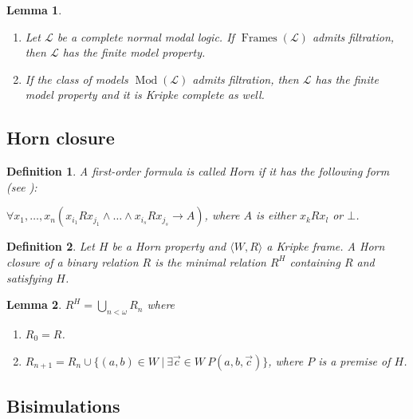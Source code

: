 \documentclass[a4paper]{article}
\theoremstyle{defin}
\newtheorem{defin}{Definition}
\theoremstyle{theorem}
\theoremstyle{prop}
\theoremstyle{lemma}
\newtheorem{lemma}{Lemma}
\theoremstyle{fact}
\theoremstyle{ex}
\theoremstyle{col}
\theoremstyle{claim}
\begin{document}
\begin{lemma}
  $ $

\begin{enumerate}
  \item Let $\mathcal{L}$ be a complete normal modal logic. If $\operatorname{Frames}(\mathcal{L})$ admits filtration, then $\mathcal{L}$ has the finite model property.
  \item If the class of models $\operatorname{Mod}(\mathcal{L})$ admits filtration, then $\mathcal{L}$ has the finite model property and it is Kripke complete as well.
\end{enumerate}
\end{lemma}

\subsection{Horn closure}

\begin{defin} A first-order formula is called Horn if it has the following form (see \cite{chang1990model}):

  \begin{center}
    $\forall x_1, \dots, x_n (x_{i_1} R x_{j_1} \land \dots \land x_{i_s} R x_{j_s} \rightarrow A)$, where $A$ is either $x_k R x_l$ or $\bot$.
  \end{center}
\end{defin}

\begin{defin}
  Let $H$ be a Horn property and $\langle W, R \rangle$ a Kripke frame. A Horn closure of a binary relation $R$ is the minimal relation $R^{H}$ containing $R$ and satisfying $H$.
\end{defin}

\begin{lemma}
  $R^{H} = \bigcup \limits_{n < \omega} R_n$ where

  \begin{enumerate}
    \item $R_0 = R$.
    \item $R_{n + 1} = R_n \cup \{ (a, b) \in W \: | \: \exists \vec{c} \in W \: P(a, b, \vec{c})\}$, where $P$ is a premise of $H$.
  \end{enumerate}
\end{lemma}

\subsection{Bisimulations}
\end{document}
